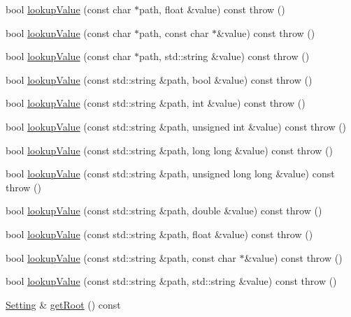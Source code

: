 \begin{DoxyCompactItemize}
bool \hyperlink{classlibconfig_1_1Config_a493217a12b64307ed2917c7ea286e24e}{lookup\-Value} (const char $\ast$path, float \&value) const   throw ()
\item 
bool \hyperlink{classlibconfig_1_1Config_a0934a631059747bd570ced12f9d19ba7}{lookup\-Value} (const char $\ast$path, const char $\ast$\&value) const   throw ()
\item 
bool \hyperlink{classlibconfig_1_1Config_a09f19c13ff6e85b86479e43b3d269e36}{lookup\-Value} (const char $\ast$path, std\-::string \&value) const   throw ()
\item 
bool \hyperlink{classlibconfig_1_1Config_aefdd467e6bfc1caf66337155e762fa59}{lookup\-Value} (const std\-::string \&path, bool \&value) const   throw ()
\item 
bool \hyperlink{classlibconfig_1_1Config_ae081df5d2ecb0c67b02dd0e72464a159}{lookup\-Value} (const std\-::string \&path, int \&value) const   throw ()
\item 
bool \hyperlink{classlibconfig_1_1Config_aeb906407ffb13dc17abc75284bf625e0}{lookup\-Value} (const std\-::string \&path, unsigned int \&value) const   throw ()
\item 
bool \hyperlink{classlibconfig_1_1Config_abac0ebba041f793bd7f0fdf4b118b22f}{lookup\-Value} (const std\-::string \&path, long long \&value) const   throw ()
\item 
bool \hyperlink{classlibconfig_1_1Config_a891a38318bcdea1ea8f17c68e1c928a0}{lookup\-Value} (const std\-::string \&path, unsigned long long \&value) const   throw ()
\item 
bool \hyperlink{classlibconfig_1_1Config_ac4d63696452375134a8a33aa9137e8ad}{lookup\-Value} (const std\-::string \&path, double \&value) const   throw ()
\item 
bool \hyperlink{classlibconfig_1_1Config_abd86ae4d09edafb2d79a4656b99c9433}{lookup\-Value} (const std\-::string \&path, float \&value) const   throw ()
\item 
bool \hyperlink{classlibconfig_1_1Config_a5087522213b6c2b2b658c6d1fdbe21dd}{lookup\-Value} (const std\-::string \&path, const char $\ast$\&value) const   throw ()
\item 
bool \hyperlink{classlibconfig_1_1Config_acbe75986295275d5beb1b6e54bd80554}{lookup\-Value} (const std\-::string \&path, std\-::string \&value) const   throw ()
\item 
\hyperlink{classlibconfig_1_1Setting}{Setting} \& \hyperlink{classlibconfig_1_1Config_a10e517e0d174ce21141b9d24b1b2c5db}{get\-Root} () const 
\end{DoxyCompactItemize}
